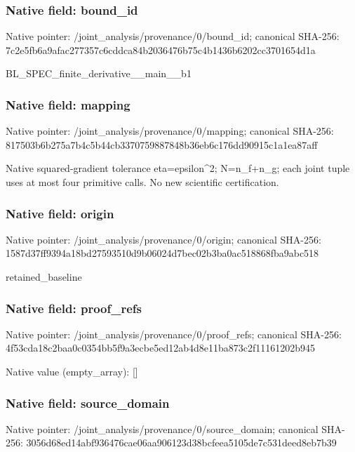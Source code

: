 \documentclass[10pt,a4paper]{article}
\begin{document}
\subsubsection{Native field: bound\_\allowbreak{}id}
Native pointer: /joint\_\allowbreak{}analysis/provenance/0/bound\_\allowbreak{}id; canonical SHA-256: 7c2e5fb6a9afac277357c6cddca84b2036476b75c4b1436b6202cc3701654d1a

\begingroup\raggedright\sloppy BL\_\allowbreak{}SPEC\_\allowbreak{}finite\_\allowbreak{}derivative\_\allowbreak{}\_\allowbreak{}main\_\allowbreak{}\_\allowbreak{}b1\par\endgroup

\subsubsection{Native field: mapping}
Native pointer: /joint\_\allowbreak{}analysis/provenance/0/mapping; canonical SHA-256: 817503b6b275a7b4c5b44cb3370759887848b36eb6c176dd90915c1a1ea87aff

\begingroup\raggedright\sloppy Native squared-gradient tolerance eta=\allowbreak{}epsilon\textasciicircum{}2;\allowbreak{} N=\allowbreak{}n\_\allowbreak{}f+n\_\allowbreak{}g;\allowbreak{} each joint tuple uses at most four primitive calls. No new scientific certification.\par\endgroup

\subsubsection{Native field: origin}
Native pointer: /joint\_\allowbreak{}analysis/provenance/0/origin; canonical SHA-256: 1587d37ff9394a18bd27593510d9b06024d7bec02b3ba0ac518868fba9abc518

\begingroup\raggedright\sloppy retained\_\allowbreak{}baseline\par\endgroup

\subsubsection{Native field: proof\_\allowbreak{}refs}
Native pointer: /joint\_\allowbreak{}analysis/provenance/0/proof\_\allowbreak{}refs; canonical SHA-256: 4f53cda18c2baa0c0354bb5f9a3ecbe5ed12ab4d8e11ba873c2f11161202b945

Native value (empty\_\allowbreak{}array): []

\subsubsection{Native field: source\_\allowbreak{}domain}
Native pointer: /joint\_\allowbreak{}analysis/provenance/0/source\_\allowbreak{}domain; canonical SHA-256: 3056d68ed14abf936476cae06aa906123d38bcfeea5105de7c531deed8eb7b39
\end{document}
